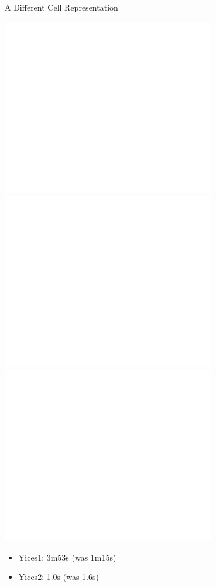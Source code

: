\documentclass{beamer}
\begin{document}
\begin{frame}{A Different Cell Representation}
\begin{overprint}
 \includegraphics[width=0.7\textwidth]{bitcell5}
 \includegraphics[width=0.7\textwidth]{bitcell6}
 \includegraphics[width=0.7\textwidth]{bitcell7}
\end{overprint}
\begin{itemize}
\item Yices1: 3m53s (was 1m15s)
\item Yices2: 1.0s  (was 1.6s)
\end{itemize}
\end{frame}
\end{document}
